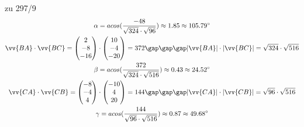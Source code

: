 \begin{exercise}{zu 297/9}
\begin{gather*}
    \alpha = acos(\frac{-48}{\sqrt{324} \cdot \sqrt{96}}) \approx 1.85 \approx 105.79^\circ \\
    \vv{BA} \cdot \vv{BC} = \begin{pmatrix}2 \\ -8 \\ -16\end{pmatrix} \cdot \begin{pmatrix}10 \\ -4 \\ -20\end{pmatrix} = 372 \gap\gap\gap |\vv{BA}| \cdot |\vv{BC}| = \sqrt{324} \cdot \sqrt{516} \\
    \beta = acos(\frac{372}{\sqrt{324} \cdot \sqrt{516}}) \approx 0.43 \approx 24.52^\circ \\
    \vv{CA} \cdot \vv{CB} = \begin{pmatrix}-8 \\ -4 \\ 4\end{pmatrix} \cdot \begin{pmatrix}-10 \\ 4 \\ 20\end{pmatrix} = 144 \gap\gap\gap |\vv{CA}| \cdot |\vv{CB}| = \sqrt{96} \cdot \sqrt{516} \\
    \gamma = acos(\frac{144}{\sqrt{96} \cdot \sqrt{516}}) \approx 0.87 \approx 49.68^\circ
  \end{gather*}
\end{exercise}
\newpage
